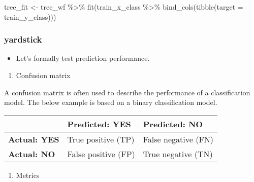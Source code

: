 \documentclass[
]{book}
\newenvironment{Shaded}{\begin{snugshade}}{\end{snugshade}}
\newcommand{\AttributeTok}[1]{\textcolor[rgb]{0.77,0.63,0.00}{#1}}
\newcommand{\FunctionTok}[1]{\textcolor[rgb]{0.00,0.00,0.00}{#1}}
\newcommand{\NormalTok}[1]{#1}
\newcommand{\OtherTok}[1]{\textcolor[rgb]{0.56,0.35,0.01}{#1}}
\newcommand{\SpecialCharTok}[1]{\textcolor[rgb]{0.00,0.00,0.00}{#1}}
\providecommand{\tightlist}{%
  \setlength{\itemsep}{0pt}\setlength{\parskip}{0pt}}
\begin{document}
\begin{Shaded}
\begin{Highlighting}[]
\NormalTok{tree\_fit }\OtherTok{\textless{}{-}}\NormalTok{ tree\_wf }\SpecialCharTok{\%\textgreater{}\%} \FunctionTok{fit}\NormalTok{(train\_x\_class }\SpecialCharTok{\%\textgreater{}\%} \FunctionTok{bind\_cols}\NormalTok{(}\FunctionTok{tibble}\NormalTok{(}\AttributeTok{target =}\NormalTok{ train\_y\_class)))}
\end{Highlighting}
\end{Shaded}

\hypertarget{yardstick-1}{%
\subsubsection{yardstick}\label{yardstick-1}}

\begin{itemize}
\tightlist
\item
  Let's formally test prediction performance.
\end{itemize}

\begin{enumerate}
\def\labelenumi{\arabic{enumi}.}
\tightlist
\item
  Confusion matrix
\end{enumerate}

A confusion matrix is often used to describe the performance of a classification model. The below example is based on a binary classification model.

\begin{longtable}[]{@{}lll@{}}
\toprule
& Predicted: YES & Predicted: NO \\
\midrule
\endhead
\textbf{Actual: YES} & True positive (TP) & False negative (FN) \\
\textbf{Actual: NO} & False positive (FP) & True negative (TN) \\
\bottomrule
\end{longtable}

\begin{enumerate}
\def\labelenumi{\arabic{enumi}.}
\setcounter{enumi}{1}
\tightlist
\item
  Metrics
\end{enumerate}
\end{document}
